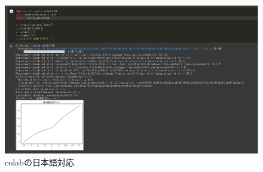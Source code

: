 \documentclass[a4j]{jarticle}
\begin{document}
        \begin{figure}[H]
          \centering
          \includegraphics[scale=1.3]{colab-result2.eps}
          \caption{colabの日本語対応}
           \label{colab-result2}
          \end{figure}
\end{document}
